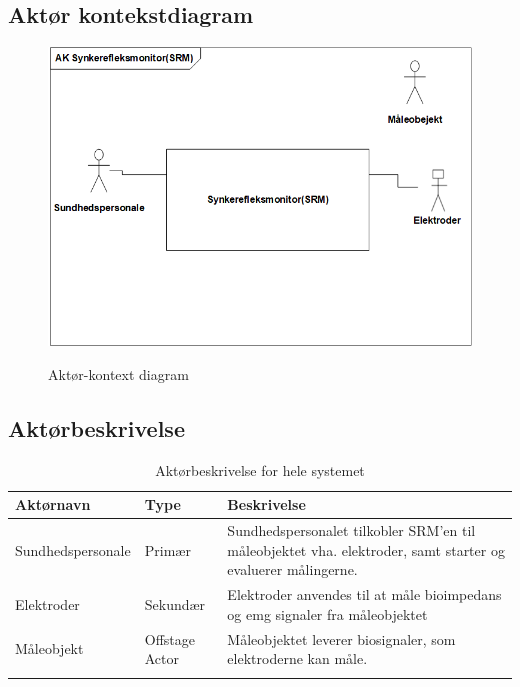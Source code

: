 \subsection{Aktør kontekstdiagram}

\begin{figure}[H]
\centering
{\includegraphics[width=\textwidth]
{Figure/AktoerKontextDiagram}}
\caption{Aktør-kontext diagram}
\label{fig:sysbeskrivelse}
\end{figure}  

\subsection{Aktørbeskrivelse}
\begin{table}[H]
\begin{tabularx}{\textwidth}{l l X}
     Aktørnavn	&	Type		&	Beskrivelse \\ \midrule
     Sundhedspersonale   	&  	Primær  	& 	Sundhedspersonalet tilkobler SRM'en til måleobjektet vha. elektroder, samt starter og evaluerer målingerne.     \\ 			  \addlinespace[2mm]
     Elektroder	&	Sekundær	& Elektroder anvendes til at måle bioimpedans og emg signaler fra måleobjektet  	 \\   \addlinespace[2mm]

Måleobjekt	&	Offstage Actor	& Måleobjektet   leverer biosignaler, som elektroderne kan måle.   	 \\   \addlinespace[2mm]
     
   
     \bottomrule                                                                                                                   
    \end{tabularx}
    \caption {Aktørbeskrivelse for hele systemet}
    \label{tab:aktoerbeskrivelse}
	
\end{table}


